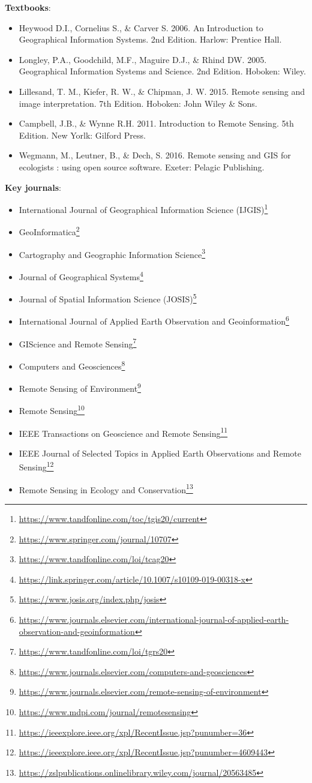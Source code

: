 \documentclass[
]{book}
\renewcommand{\href}[2]{#2\footnote{\url{#1}}}
\begin{document}
\textbf{Textbooks}:

\begin{itemize}
\item
  Heywood D.I., Cornelius S., \& Carver S. 2006. An Introduction to Geographical Information Systems. 2nd Edition. Harlow: Prentice Hall.
\item
  Longley, P.A., Goodchild, M.F., Maguire D.J., \& Rhind DW. 2005. Geographical Information Systems and Science. 2nd Edition. Hoboken: Wiley.
\item
  Lillesand, T. M., Kiefer, R. W., \& Chipman, J. W. 2015. Remote sensing and image interpretation. 7th Edition. Hoboken: John Wiley \& Sons.
\item
  Campbell, J.B., \& Wynne R.H. 2011. Introduction to Remote Sensing. 5th Edition. New Yorlk: Gilford Press.
\item
  Wegmann, M., Leutner, B., \& Dech, S. 2016. Remote sensing and GIS for ecologists : using open source software. Exeter: Pelagic Publishing.
\end{itemize}

\textbf{Key journals}:

\begin{itemize}
\item
  \href{https://www.tandfonline.com/toc/tgis20/current}{International Journal of Geographical Information Science (IJGIS)}
\item
  \href{https://www.springer.com/journal/10707}{GeoInformatica}
\item
  \href{https://www.tandfonline.com/loi/tcag20}{Cartography and Geographic Information Science}
\item
  \href{https://link.springer.com/article/10.1007/s10109-019-00318-x}{Journal of Geographical Systems}
\item
  \href{https://www.josis.org/index.php/josis}{Journal of Spatial Information Science (JOSIS)}
\item
  \href{https://www.journals.elsevier.com/international-journal-of-applied-earth-observation-and-geoinformation}{International Journal of Applied Earth Observation and Geoinformation}
\item
  \href{https://www.tandfonline.com/loi/tgrs20}{GIScience and Remote Sensing}
\item
  \href{https://www.journals.elsevier.com/computers-and-geosciences}{Computers and Geosciences}
\item
  \href{https://www.journals.elsevier.com/remote-sensing-of-environment}{Remote Sensing of Environment}
\item
  \href{https://www.mdpi.com/journal/remotesensing}{Remote Sensing}
\item
  \href{https://ieeexplore.ieee.org/xpl/RecentIssue.jsp?punumber=36}{IEEE Transactions on Geoscience and Remote Sensing}
\item
  \href{https://ieeexplore.ieee.org/xpl/RecentIssue.jsp?punumber=4609443}{IEEE Journal of Selected Topics in Applied Earth Observations and Remote Sensing}
\item
  \href{https://zslpublications.onlinelibrary.wiley.com/journal/20563485}{Remote Sensing in Ecology and Conservation}
\end{itemize}
\end{document}
